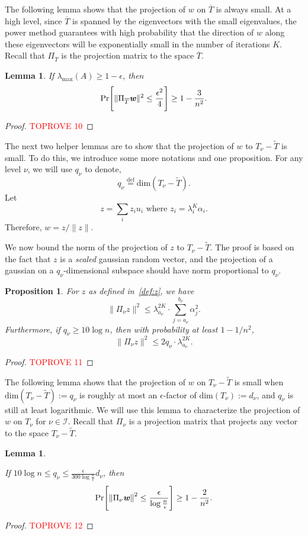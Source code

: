 \documentclass[11pt]{article}
\newcommand{\defeq}{\stackrel{\textup{def}}{=}}
\newtheorem{lemma}[theorem]{Lemma}
\newtheorem{proposition}[theorem]{Proposition}
\renewcommand{\norm}[1]{\ensuremath{\left\lVert #1 \right\rVert}}
\let\originalleft\left
\let\originalright\right
\renewcommand{\left}{\mathopen{}\mathclose\bgroup\originalleft}
\renewcommand{\right}{\aftergroup\egroup\originalright}
\def\defeq{\stackrel{\mathrm{def}}{=}}
\def\dim#1{\mathrm{dim} (#1)}
\newcommand\uu{\boldsymbol{\mathit{u}}}
\newcommand\ww{\boldsymbol{\mathit{w}}}
\newcommand\zz{\boldsymbol{\mathit{z}}}
\renewcommand\AA{\boldsymbol{\mathit{A}}}
\newcommand\Ttil{{\tilde{\mathit{T}}}}
\begin{document}
The following lemma shows that the projection of $\ww$ on $\overline{T}$ is always small. At a high level, 
since $\overline{T}$ is spanned by the eigenvectors with the small eigenvalues, the power method guarantees with high probability that the direction of $\ww$ along these eigenvectors will be exponentially small in the number of iterations $K$.
Recall that $\Pi_{\overline{T}}$ is the projection matrix to the space $\overline{T}$.
\begin{lemma}\label{lem:boundLowEV}
If $\lambda_{\max}(\AA)\geq 1-\epsilon$, then
\[
\Pr\left[\|\Pi_{\overline{T}}\ww\|^2 \leq \frac{\epsilon^2}{4}\right]\geq 1 - \frac{3}{n^2}.
\]
\end{lemma}
\begin{proof}\textcolor{red}{TOPROVE 10}\end{proof}


The next two helper lemmas are to show that the projection of $\ww$ to $T_{\nu}- \tilde{T}$ is small. To do this, we introduce some more notations and one proposition. 
For any level $\nu$, we will use $q_{\nu}$ to denote,
\begin{equation}
    q_{\nu} \defeq \dim{T_{\nu}-\tilde{T}}.
\end{equation}
Let 
\begin{equation}\label{def:z}
\zz=\sum_{i}z_{i}\uu_{i}\text{ where }z_{i}=\lambda_{i}^{K}\alpha_{i}.
\end{equation} 
Therefore, $\ww=\zz/\|\zz\|$.

We now bound the norm of the projection of $\zz$ to $T_\nu - \Ttil$. The proof is based on the fact that $\zz$ is a {\it scaled} gaussian random vector, and the projection of a gaussian on a $q_{\nu}$-dimensional subspace should have norm proportional to $q_{\nu}$. 
\begin{proposition}\label{lem:projZ}
For $\zz$ as defined in~\eqref{def:z}, we have
\[
\|\Pi_{\nu}\zz\|^2 \leq \lambda_{a_{\nu}}^{2K} \cdot \sum_{j=a_{\nu}}^{b_{\nu}}\alpha_j^2.
\] 
Furthermore, if $q_{\nu}\geq 10 \log n$, then with probability at least $1-1/n^2$,
\[
\|\Pi_{\nu}\zz\|^2 \leq 2q_{\nu}\cdot \lambda_{a_{\nu}}^{2K}.
\]
\end{proposition}
\begin{proof}\textcolor{red}{TOPROVE 11}\end{proof}
The following lemma shows that the projection of $\ww$ on $T_{\nu}-\Ttil$ is small when $\dim{T_\nu - \Ttil}:= q_\nu$ is roughly at most an $\epsilon$-factor of $\dim{T_\nu}:= d_\nu$, and $q_\nu$ is still at least logarithmic.
We will use this lemma to characterize the projection of $\ww$ on $T_{\nu}$ for $\nu \in \mathcal{I}$. 
Recall that $\Pi_\nu$ is a projection matrix that projects any vector to the space $T_{\nu}-\Ttil$.
\begin{lemma}\label{lem:GaussianProjD}

If $ 10 \log n \leq q_{\nu} \leq \frac{\epsilon}{300\log\frac{n}{\epsilon}}d_{\nu}$, then
\[
\Pr\left[\norm{\Pi_{\nu}\ww}^2 \leq \frac{\epsilon}{\log\frac{n}{\epsilon}} \right] \geq 1-\frac{2}{n^{2}}.
\]
\end{lemma}
\begin{proof}\textcolor{red}{TOPROVE 12}\end{proof}
\end{document}
